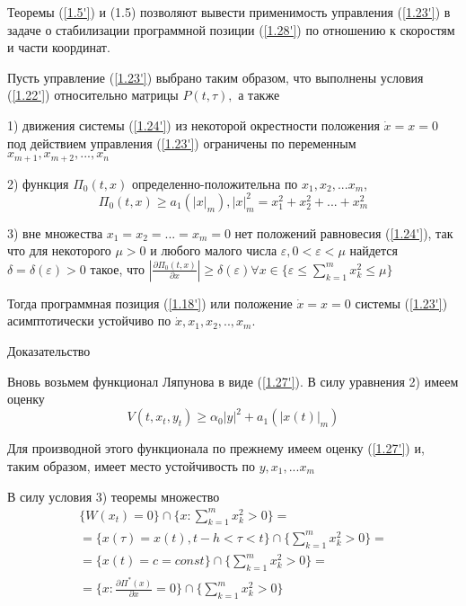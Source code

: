 Теоремы (\ref{1.5'}) и (1.5) позволяют вывести применимость управления (\ref{1.23'}) в задаче о стабилизации программной позиции (\ref{1.28'}) по отношению к скоростям и части координат. 

\begin{theorem}\label{t-1.9}
Пусть управление (\ref{1.23'}) выбрано таким образом, что выполнены условия (\ref{1.22'}) относительно матрицы $P(t, \tau),$ а также 

1) движения системы (\ref{1.24'}) из некоторой окрестности положения $\dot x = x= 0$ под действием управления (\ref{1.23'}) ограничены по переменным $x_{m+1}, x_{m+2}, ... , x_n$ 

2) функция $\Pi_0 (t, x)$ определенно-положительна по $x_1, x_2, ... x_m$,
$$\Pi_0(t, x) \ge a_1 (\left| x \right|_m), \left| x \right|^2_m = x_1^2 + x_2^2 + ... + x_m^2$$

3) вне множества ${x_1 = x_2 = ... = x_m = 0}$ нет положений равновесия (\ref{1.24'}), так что для некоторого $\mu > 0$ и любого малого числа  $\varepsilon, 0 < \varepsilon < \mu$ найдется $\delta = \delta(\varepsilon) > 0$ такое, что $\displaystyle \left| \frac{\partial \Pi_0 (t, x)}{\partial x} \right| \ge \delta(\varepsilon) \forall x \in \lbrace \varepsilon \le \sum_{k = 1}^{m} x_k^2 \le \mu \rbrace$

Тогда программная позиция (\ref{1.18'}) или положение $\dot x = x = 0$ системы (\ref{1.23'}) асимптотически устойчиво по $\dot x, x_1, x_2,.., x_m.$
\end{theorem}

Доказательство 

Вновь возьмем функционал Ляпунова в виде (\ref{1.27'}). В силу уравнения 2) имеем оценку
$$
V(t, x_t, y_t) \ge \alpha_0 \left| y \right| ^2 + a_1 (\left| x(t) \right|_m)
$$

Для производной этого функционала по прежнему имеем оценку (\ref{1.27'}) и, таким образом, имеет место устойчивость по $y, x_1, ... x_m$

В силу условия 3) теоремы множество 
$$
\begin{array}{c}
\displaystyle \lbrace W(x_t) = 0 \rbrace \cap \lbrace x : \sum_{k = 1}^{m} x_k^2 > 0 \rbrace =\\
\displaystyle = \lbrace x(\tau) = x(t), t - h < \tau < t \rbrace \cap \lbrace \sum_{k = 1}^{m} x_k^2 > 0 \rbrace =\\
\displaystyle = \lbrace x(t) = c = const \rbrace \cap \lbrace \sum_{k = 1}^{m} x_k^2 > 0 \rbrace =\\
\displaystyle = \lbrace x: \frac{\partial \Pi^{*} (x)}{\partial x} = 0 \rbrace \cap \lbrace \sum_{k = 1}^{m} x_k^2 > 0 \rbrace
\end{array}
$$

